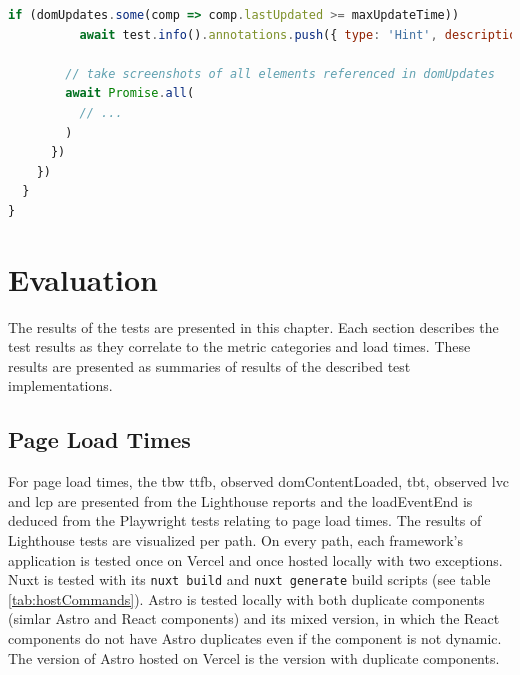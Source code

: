 \documentclass[a4paper, 10pt]{article}
\begin{document}
\begin{lstlisting}[caption={Test file for component update times}, label={lst:state-change-spec}, language=JavaScript, escapechar=°]
        if (domUpdates.some(comp => comp.lastUpdated >= maxUpdateTime))
          await test.info().annotations.push({ type: 'Hint', description: `Screenshots below show slow updating components` });

        // take screenshots of all elements referenced in domUpdates
        await Promise.all(
          // ...
        )
      })
    })
  }
}
\end{lstlisting}
  
\section{Evaluation}\label{sec:evaluation}

The results of the tests are presented in this chapter.
Each section describes the test results as they correlate to the metric categories and load times.
These results are presented as summaries of results of the described test implementations.

\subsection{Page Load Times}\label{subsec:pageloadtimes}

For page load times, the \acrshort{tbw} \acrshort{ttfb}, observed domContentLoaded, \acrshort{tbt}, observed \acrshort{lvc} and \acrshort{lcp} are presented from the Lighthouse reports and the loadEventEnd is deduced from the Playwright tests relating to page load times.
The results of Lighthouse tests are visualized per path.
On every path, each framework's application is tested once on Vercel and once hosted locally with two exceptions.
Nuxt is tested with its \verb|nuxt build| and \verb|nuxt generate| build scripts (see table \ref{tab:hostCommands}).
Astro is tested locally with both duplicate components (simlar Astro and React components) and its mixed version, in which the React components do not have Astro duplicates even if the component is not dynamic.
The version of Astro hosted on Vercel is the version with duplicate components.
\end{document}
